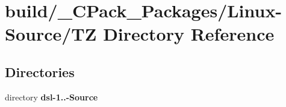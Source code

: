 \section{build/\-\_\-\-C\-Pack\-\_\-\-Packages/\-Linux-\/\-Source/\-T\-Z Directory Reference}
\label{dir_6f795e1767245fe01dfc4bdd6a6d115f}
\subsection*{Directories}
\begin{DoxyCompactItemize}
\item 
directory {\bf dsl-\/1..-\/\-Source}
\end{DoxyCompactItemize}
